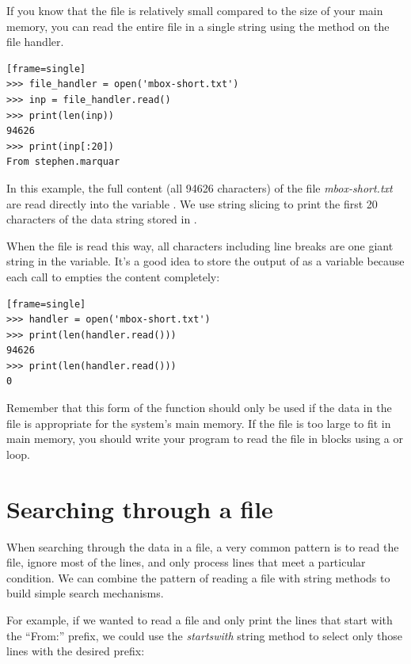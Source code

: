 If you know that the file is relatively small compared to the size of your main memory, you can read the entire file in a single string using the  method on the file handler.

\begin{Verbatim}[frame=single][frame=single]
>>> file_handler = open('mbox-short.txt')
>>> inp = file_handler.read()
>>> print(len(inp))
94626
>>> print(inp[:20])
From stephen.marquar
\end{Verbatim}

In this example, the full content (all 94626 characters) of the file \emph{mbox-short.txt} are read directly into the variable . We use string slicing to print the first 20 characters of the data string stored in .

When the file is read this way, all characters including line breaks are one giant string in the  variable. It's a good idea to store the output of  as a variable because each call to  empties the content completely:

\begin{Verbatim}[frame=single][frame=single]
>>> handler = open('mbox-short.txt')
>>> print(len(handler.read()))
94626
>>> print(len(handler.read()))
0
\end{Verbatim}

Remember that this form of the  function should only be used if the data in the file is appropriate for the system's main memory. If the file is too large to fit in main memory, you should write your program to read the file in blocks using a  or  loop.

\hypertarget{buxfasqueda-a-travuxe9s-de-un-fichero}{%
\section{Searching through a file}\label{buxfasqueda-a-travuxe9s-de-un-fichero}}

When searching through the data in a file, a very common pattern is to read the file, ignore most of the lines, and only process lines that meet a particular condition. We can combine the pattern of reading a file with string methods to build simple search mechanisms.

 

For example, if we wanted to read a file and only print the lines that start with the ``From:'' prefix, we could use the \emph{startswith} string method to select only those lines with the desired prefix:


